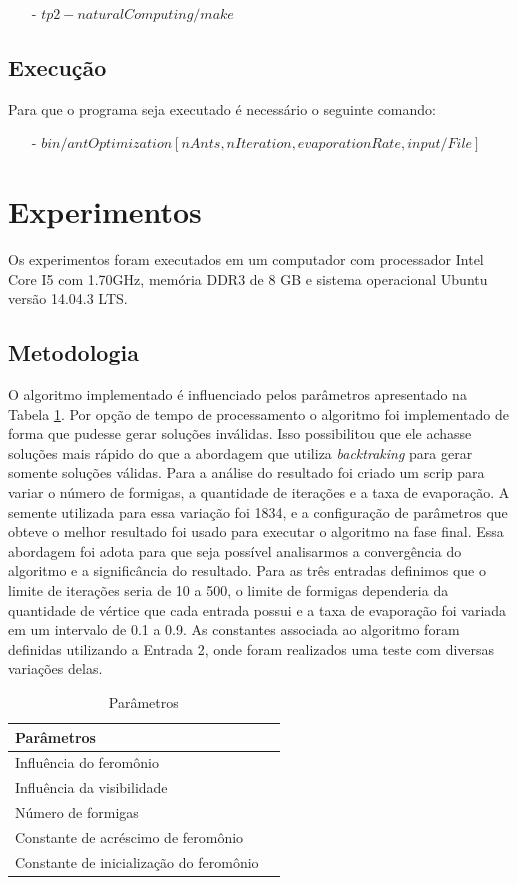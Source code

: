 \documentclass[a4paper, 12pt]{article}
\begin{document}
\begin{enumerate}
\item[-] $tp2-naturalComputing/make$
\end{enumerate}


\subsection{Execução}
Para que o programa seja executado é necessário o seguinte comando:

\begin{enumerate}
\item[-] $bin/antOptimization [nAnts, nIteration, evaporationRate, input/File]$
\end{enumerate}

\section{Experimentos}
Os experimentos foram executados em um computador com processador Intel Core I5 com 1.70GHz, memória DDR3 de 8 GB e sistema operacional Ubuntu versão 14.04.3 LTS.


\subsection{Metodologia}
O algoritmo implementado é influenciado pelos parâmetros apresentado na Tabela \ref{tab1}. Por opção de tempo de processamento o algoritmo foi implementado de forma que pudesse gerar soluções inválidas. Isso possibilitou que ele achasse soluções mais rápido do que a abordagem que utiliza \textit{backtraking} para gerar somente soluções válidas. Para a análise do resultado foi criado um scrip para variar o número de formigas, a quantidade de iterações e a taxa de evaporação. A semente utilizada para essa variação foi 1834, e a configuração de parâmetros que obteve o melhor resultado foi usado para executar o algoritmo na fase final. Essa abordagem foi adota para que seja possível analisarmos a convergência do algoritmo e a significância do resultado. Para as três entradas definimos que o limite de iterações seria de 10 a 500, o limite de formigas dependeria da quantidade de vértice que cada entrada possui e a taxa de evaporação foi variada em um intervalo de 0.1 a 0.9. As constantes associada ao algoritmo foram definidas utilizando a Entrada 2, onde foram realizados uma teste com diversas variações delas. 

\begin{table}[!htb]
\centering
\caption{Parâmetros}
\label{tab1}
\begin{tabular}{|l|l|}
\hline
Parâmetros                               \\\hline
Influência do feromônio                  \\
Influência da visibilidade               \\
Número de formigas                       \\
Constante de acréscimo de feromônio      \\
Constante de inicialização do feromônio  \\\hline
\end{tabular}
\end{table}
\end{document}
